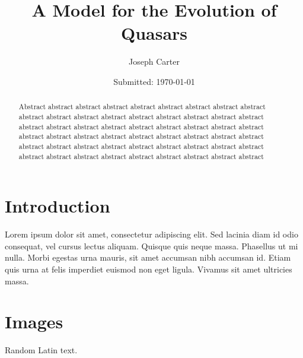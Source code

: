 \documentclass[12pt, twocolumn]{revtex4}    %
\begin{document}
                     


\title{A Model for the Evolution of Quasars} 
\date{Submitted: \today{}}
\author{Joseph Carter}

\begin{abstract}              
 
Abstract abstract abstract abstract abstract abstract abstract abstract abstract abstract abstract abstract abstract abstract abstract abstract abstract abstract abstract abstract abstract abstract abstract abstract abstract abstract abstract abstract abstract abstract abstract abstract abstract abstract abstract abstract abstract abstract abstract abstract abstract abstract abstract abstract abstract abstract abstract abstract abstract abstract abstract abstract abstract abstract 

\end{abstract}


\maketitle
\onecolumngrid


\tableofcontents
\newpage
\twocolumngrid


\section{Introduction}

Lorem ipsum dolor sit amet, consectetur adipiscing elit. Sed lacinia diam id odio consequat, vel cursus lectus aliquam. Quisque quis neque massa. Phasellus ut mi nulla. Morbi egestas urna mauris, sit amet accumsan nibh accumsan id. Etiam quis urna at felis imperdiet euismod non eget ligula. Vivamus sit amet ultricies massa.

\section{Images}

Random Latin text.

\onecolumngrid
\end{document}
